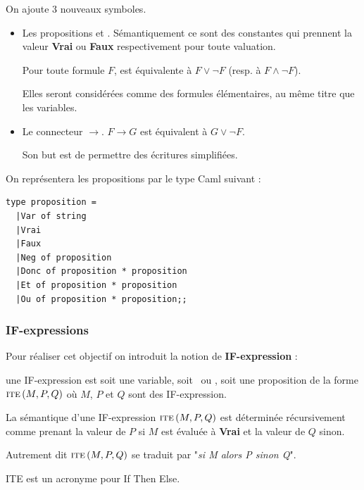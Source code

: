On ajoute 3 nouveaux symboles.
\begin{itemize}
\item Les propositions \V et \F. 
Sémantiquement ce sont des constantes qui prennent la valeur {\bf Vrai} ou {\bf Faux} respectivement pour toute valuation.

Pour toute formule $F$, \V est équivalente à $F \lor \neg F$ (resp. à $F \land \neg F$).

Elles seront considérées comme des formules élémentaires, au même titre que les variables.
\item Le connecteur $\rightarrow$.
$F \rightarrow G$ est équivalent à $G \lor \neg F$.

Son but est de permettre des écritures simplifiées.
\end{itemize}
\smallskip
On représentera les propositions par le type Caml suivant :
\begin{lstlisting}
type proposition =
  |Var of string
  |Vrai
  |Faux
  |Neg of proposition
  |Donc of proposition * proposition
  |Et of proposition * proposition
  |Ou of proposition * proposition;;
\end{lstlisting}
\subsubsection*{IF-expressions}
Pour réaliser cet objectif on introduit la notion de \textbf{IF-expression} : 

une IF-expression est soit une variable, soit \V\ ou \F, soit une proposition de la forme $\text{\sc ite}\,(M, P, Q)$  où $M$, $P$ et $Q$ sont des IF-expression. 

La sémantique d'une IF-expression $\text{\sc ite}\,(M, P, Q)$ est déterminée récursivement comme 
prenant la valeur de $P$ si $M$ est évaluée à {\bf Vrai} et la valeur de $Q$ sinon. 

Autrement dit $\text{\sc ite}\,(M, P, Q)$ se traduit par "{\it si M alors P sinon Q}".

ITE est un acronyme pour If Then Else.

